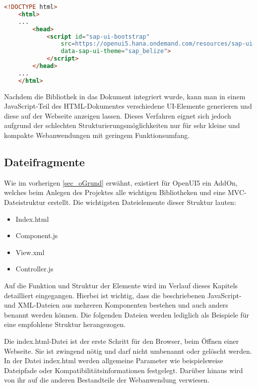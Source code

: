 \begin{lstlisting}[caption=Beispiel für das Einbinden von OpenUI5, label=lst:UI5Einbinden, language=HTML]
<!DOCTYPE html>
	<html>
	...
		<head>
			<script id="sap-ui-bootstrap"
				src=https://openui5.hana.ondemand.com/resources/sap-ui-core.js
				data-sap-ui-theme="sap_belize">
			</script>
		</head>
	...
	</html>
\end{lstlisting}

Nachdem die Bibliothek in das Dokument integriert wurde, kann man in einem JavaScript-Teil des HTML-Dokumentes verschiedene UI-Elemente generieren und diese auf der Webseite anzeigen lassen. Dieses Verfahren eignet sich jedoch aufgrund der schlechten Strukturierungsmöglichkeiten nur für sehr kleine und kompakte Webanwendungen mit geringem Funktionsumfang.\autocites[vgl.][136\psqq]{Antolovic2014}

\subsection{Dateifragmente}\label{sec:oDateien}

Wie im vorherigen \autoref{sec_oGrund} erwähnt, existiert für OpenUI5 ein AddOn, welches beim Anlegen des Projektes alle wichtigen Bibliotheken und eine MVC-Dateistruktur erstellt. Die wichtigsten Dateielemente dieser Struktur lauten:

\begin{itemize}
	\item Index.html
	\item Component.js
	\item View.xml
	\item Controller.js
\end{itemize}

Auf die Funktion und Struktur der Elemente wird im Verlauf dieses Kapitels detailliert eingegangen. Hierbei ist wichtig, dass die beschriebenen JavaScript- und XML-Dateien aus mehreren Komponenten bestehen und auch anders benannt werden können. Die folgenden Dateien werden lediglich als Beispiele für eine empfohlene Struktur herangezogen. 

Die index.html-Datei ist der erste Schritt für den Browser, beim Öffnen einer Webseite. Sie ist zwingend nötig und darf nicht umbenannt oder gelöscht werden. In der Datei index.html werden allgemeine Parameter wie beispielsweise Dateipfade oder Kompatibilitätsinformationen festgelegt. Darüber hinaus wird von ihr auf die anderen Bestandteile der Webanwendung verwiesen.

